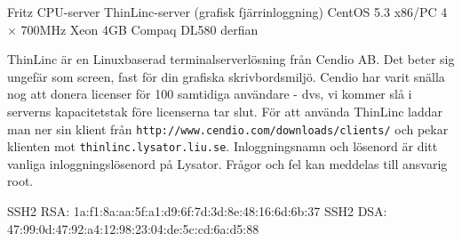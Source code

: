 \documentclass[a5paper]{article}
\begin{document}
   \computerdescription
       {Fritz}
       {CPU-server}
       {ThinLinc-server \linebreak (grafisk fjärrinloggning)}
       {CentOS 5.3}
       {x86/PC}
       {4 $\times$ 700MHz Xeon}
       {4GB}
       {Compaq DL580}
       {derfian}

    { ThinLinc är en Linuxbaserad
     terminalserverlösning från Cendio AB. Det beter sig ungefär som
     screen, fast för din grafiska skrivbordsmiljö. Cendio har varit
     snälla nog att donera licenser för 100 samtidiga användare - dvs,
     vi kommer slå i serverns kapacitetstak före licenserna tar
     slut. För att använda ThinLinc laddar man ner sin klient från
     \texttt{http://www.cendio.com/downloads/clients/} och pekar klienten mot
     \texttt{thinlinc.lysator.liu.se}. Inloggningsnamn och lösenord är ditt
     vanliga inloggningslösenord på Lysator. Frågor och fel kan
     meddelas till ansvarig root.}


   \sshfingerprintheading
   \begin{sshfingerprint}
SSH2 RSA: 1a:f1:8a:aa:5f:a1:d9:6f:7d:3d:8e:48:16:6d:6b:37
SSH2 DSA: 47:99:0d:47:92:a4:12:98:23:04:de:5c:cd:6a:d5:88
   \end{sshfingerprint}
\end{document}
